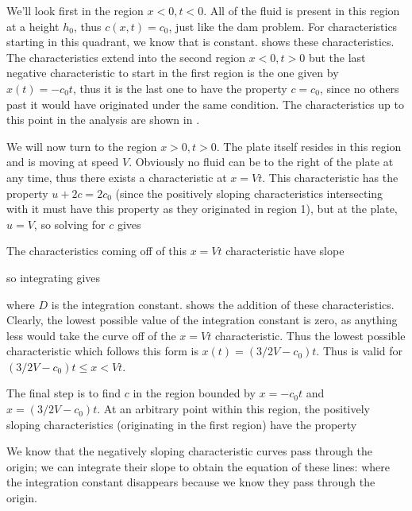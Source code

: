 \documentclass[12pt]{book}
\begin{document}
{We'll look first in the region $x<0\comma t<0$.  All of the fluid is present in this region at a height $h_0$, thus $c(x,t) = c_0$, just like the dam problem.  For characteristics starting in this quadrant, we know that 
is constant.  shows these characteristics.  The characteristics extend into the second region $x<0\comma t>0$ but the last negative characteristic to start in the first region is the one given by $x(t) = -c_0 t$, thus it is the last one to have the property $c=c_0$, since no others past it would have originated under the same condition. The characteristics up to this point in the analysis are shown in .


We will now turn to the region $x>0\comma t>0$. The plate itself resides in this region and is moving at speed $V$.  Obviously no fluid can be to the right of the plate at any time, thus there exists a characteristic at $x=Vt$.  This characteristic has the property $u+2c=2c_0$ (since the positively sloping characteristics intersecting with it must have this property as they originated in region 1), but at the plate, $u=V$, so solving for $c$ gives

The characteristics coming off of this $x=Vt$ characteristic have slope

 so integrating gives

 where $D$ is the integration constant.
 shows the addition of these characteristics.  Clearly, the lowest possible value of the integration constant is zero, as anything less would take the curve off of the $x=Vt$ characteristic.  Thus the lowest possible characteristic which follows this form is $x(t) = (3/2V-c_0)t$.  Thus  is valid for $ (3/2V-c_0)t \le x < Vt$.



The final step is to find $c$ in the region bounded by $x=-c_0t$ and $x = (3/2V-c_0)t$.  At an arbitrary point within this region, the positively sloping characteristics (originating in the first region) have the property


We know that the negatively sloping characteristic curves pass through the origin; we can integrate their slope
to obtain the equation of these lines:
 where the integration constant disappears because we know they pass through the origin.

}
\end{document}
